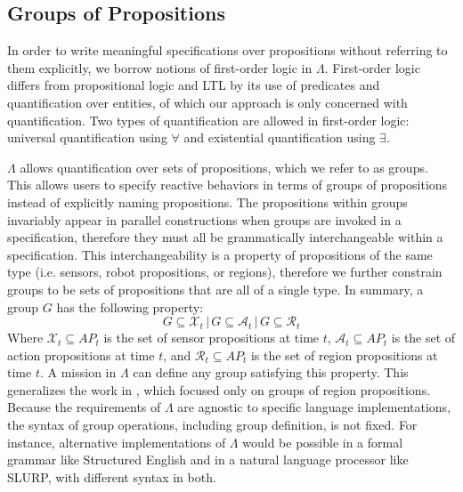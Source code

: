 \subsection{Groups of Propositions} 

In order to write meaningful specifications over propositions without referring to them explicitly, we borrow notions of first-order logic in $\Lambda$. 
First-order logic differs from propositional logic and LTL by its use of predicates and quantification over entities, of which our approach is only concerned with quantification. 
Two types of quantification are allowed in first-order logic: universal quantification using $\forall$ and existential quantification using $\exists$. 
\par $\Lambda$ allows quantification over sets of propositions, which we refer to as groups. 
This allows users to specify reactive behaviors in terms of groups of propositions instead of explicitly naming propositions. 
The propositions within groups invariably appear in parallel constructions when groups are invoked in a specification, therefore they must all be grammatically interchangeable within a specification. 
This interchangeability is a property of propositions of the same type (i.e. sensors, robot propositions, or regions), therefore we further constrain groups to be sets of propositions that are all of a single type. 
In summary, a group $G$ has the following property:
\begin{equation}
	G \subseteq \mathcal{X}_t\,|\,G \subseteq \mathcal{A}_t\,|\,G \subseteq \mathcal{R}_t
\end{equation}
Where $\mathcal{X}_t \subseteq AP_t$ is the set of sensor propositions at time $t$, $\mathcal{A}_t \subseteq AP_t$ is the set of action propositions at time $t$, and $\mathcal{R}_t \subseteq AP_t$ is the set of region propositions at time $t$. 
A mission in $\Lambda$ can define any group satisfying this property.
This generalizes the work in \cite{BingxinRSS2012}, which focused only on groups of region propositions. 
Because the requirements of $\Lambda$ are agnostic to specific language implementations, the syntax of group operations, including group definition, is not fixed. 
For instance, alternative implementations of $\Lambda$ would be possible in a formal grammar like Structured English\cite{Finucane2010} and in a natural language processor like SLURP\cite{RamanRSS2013}, with different syntax in both. 

